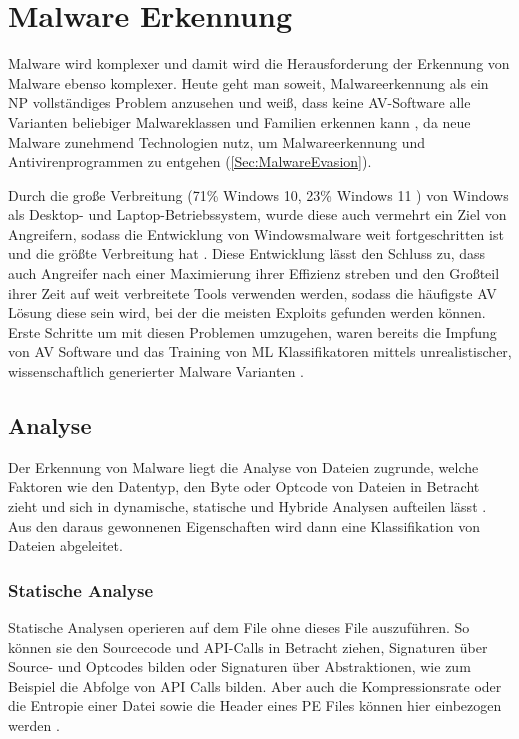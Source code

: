\section{Malware Erkennung}
\label{Sec:Malwaredetektion}
Malware wird komplexer \cite{pascalmaniriho_2023_a}  und damit wird die Herausforderung der Erkennung von Malware ebenso komplexer. Heute geht man soweit,  Malwareerkennung als ein NP vollständiges Problem anzusehen \cite{ aslan_2020_a,pascalmaniriho_2023_a} und weiß, dass keine AV-Software alle Varianten beliebiger Malwareklassen und Familien erkennen kann \cite{aboaoja_2022_malware}, da neue Malware zunehmend Technologien nutz, um Malwareerkennung und Antivirenprogrammen zu entgehen (\ref{Sec:MalwareEvasion}).

Durch die große Verbreitung (71\% Windows 10, 23\% Windows 11 \cite{Klotz, A}) von Windows als Desktop- und Laptop-Betriebssystem, wurde diese auch vermehrt ein Ziel von Angreifern, sodass die Entwicklung von Windowsmalware weit fortgeschritten ist und die größte Verbreitung hat \cite{aslan_2020_a}. Diese Entwicklung lässt den Schluss zu, dass auch Angreifer nach einer Maximierung ihrer Effizienz streben und den Großteil ihrer Zeit auf weit verbreitete Tools verwenden werden, sodass die häufigste AV Lösung diese sein wird, bei der die meisten Exploits gefunden werden können. Erste Schritte um mit diesen Problemen umzugehen, waren bereits die Impfung von AV Software \cite{murali_2023_evolving} und das Training von ML Klassifikatoren mittels unrealistischer, wissenschaftlich generierter Malware Varianten \cite{dyrmishi_2023_on}.

\subsection{Analyse}
Der Erkennung von Malware liegt die Analyse von Dateien zugrunde, welche Faktoren wie den Datentyp, den Byte oder Optcode von Dateien in Betracht zieht und sich in dynamische, statische und Hybride Analysen aufteilen lässt \cite{aboaoja_2023_a}. Aus den daraus gewonnenen Eigenschaften wird dann eine Klassifikation von Dateien abgeleitet.
\subsubsection{Statische Analyse}
\label{analyse:statisch}
Statische Analysen operieren auf dem File ohne dieses File auszuführen. So können sie den Sourcecode und API-Calls in Betracht ziehen, Signaturen über Source- und Optcodes bilden oder Signaturen über Abstraktionen, wie zum Beispiel die Abfolge von API Calls\cite{pascalmaniriho_2023_apimaldetect} bilden. Aber auch die Kompressionsrate oder die Entropie einer Datei sowie die Header eines PE Files können hier einbezogen werden \cite{aboaoja_2023_a, aslan_2020_a}. 

